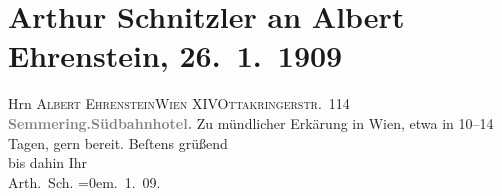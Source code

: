 

         
         \renewcommand{\erwaehntePersonen}{Personen: Albert Ehrenstein}
         \renewcommand{\erwaehnteOrte}{Orte: Ottakringerstraße, Semmering, Südbahnhotel, Wien, XIV., Penzing}
         \renewcommand{\erwaehnteWerke}{}
               \section[Arthur Schnitzler an Albert Ehrenstein, 26. 1. 1909]{ Arthur Schnitzler an Albert Ehrenstein, 26. 1. 1909}\nopagebreak{}\rehead{ }\begin{ledgroupsized}[t]{13cm}\normalsize\beginnumbering \toendnotes[C]{\smallbreak\pagebreak[2]} 
\pstart{}{\pb}Hrn \textsc{Albert Ehrenstein}\pend{}\pstart{}\textsc{Wien XIV}\pend{}\pstart{}\textsc{Ottakringerstr. 114}\pend{}{\bigskip}\pstart
           \noindent{}\centering{}\textcolor{gray}{\textbf{{\pb}Semmering.\hspace*{1.5em}Südbahnhotel.}}\pend
           \pstart
           {\pb}Zu mündlicher Erkärung in Wien, etwa in 10–14 Tagen, gern bereit.\pend
           \pstart
           Beſtens grüßend{\\[\baselineskip]}bis dahin Ihr{\\[\baselineskip]}\spacefill\mbox{Arth. Sch.}\pend
           \leftskip=0em{}. 1. 09.\pend
           
         
         \endnumbering{}\end{ledgroupsized}  \newcommand{\dateiname}{L01828}\newcommand{\titel}{Arthur Schnitzler an Albert Ehrenstein, 26. 1. 1909}\newcommand{\editorInnen}{Martin Anton Müller und Gerd-Hermann Susen}
      
